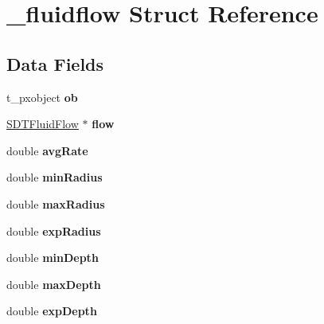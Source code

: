 \hypertarget{struct__fluidflow}{}\section{\+\_\+fluidflow Struct Reference}
\label{struct__fluidflow}
\subsection*{Data Fields}
\begin{DoxyCompactItemize}
\item 
\hypertarget{struct__fluidflow_a55b4380edb216f04a1c42b9095594963}{}t\+\_\+pxobject {\bfseries ob}\label{struct__fluidflow_a55b4380edb216f04a1c42b9095594963}

\item 
\hypertarget{struct__fluidflow_aac0dc7249f45932643e490d9fb726be7}{}\hyperlink{struct_s_d_t_fluid_flow}{S\+D\+T\+Fluid\+Flow} $\ast$ {\bfseries flow}\label{struct__fluidflow_aac0dc7249f45932643e490d9fb726be7}

\item 
\hypertarget{struct__fluidflow_aeefbb2cb0cc8a54a0d1076312c3533b8}{}double {\bfseries avg\+Rate}\label{struct__fluidflow_aeefbb2cb0cc8a54a0d1076312c3533b8}

\item 
\hypertarget{struct__fluidflow_afaab98fae8b618c35e0a96f1c651f2a8}{}double {\bfseries min\+Radius}\label{struct__fluidflow_afaab98fae8b618c35e0a96f1c651f2a8}

\item 
\hypertarget{struct__fluidflow_a55fa5e582605722608935652630ea60f}{}double {\bfseries max\+Radius}\label{struct__fluidflow_a55fa5e582605722608935652630ea60f}

\item 
\hypertarget{struct__fluidflow_a38a0ca22b21c72ebbd3b4f93af174432}{}double {\bfseries exp\+Radius}\label{struct__fluidflow_a38a0ca22b21c72ebbd3b4f93af174432}

\item 
\hypertarget{struct__fluidflow_a553109488119f08750b87dab552c31e5}{}double {\bfseries min\+Depth}\label{struct__fluidflow_a553109488119f08750b87dab552c31e5}

\item 
\hypertarget{struct__fluidflow_a6a4fdafe2923ec0b425ce0041a23119b}{}double {\bfseries max\+Depth}\label{struct__fluidflow_a6a4fdafe2923ec0b425ce0041a23119b}

\item 
\hypertarget{struct__fluidflow_aa113e7e08edc0f8b071d99722d0f34f6}{}double {\bfseries exp\+Depth}\label{struct__fluidflow_aa113e7e08edc0f8b071d99722d0f34f6}


\end{DoxyCompactItemize}
